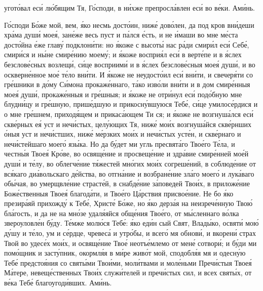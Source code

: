 \begin{mymulticols}
угот\'{о}вал ес\'{и} л\'{ю}бящим Тя, Г\'{о}споди, в н\'{и}хже препросл\'{а}влен ес\'{и} во в\'{е}ки. Ам\'{и}нь.


Г\'{о}споди Б\'{о}же мой, вем, \'{я}ко несмь дост\'{о}ин, ниж\'{е} дов\'{о}лен, да под кров вн\'{и}деши хр\'{а}ма душ\'{и} мое\'{я}, зан\'{е}же весь пуст и п\'{а}лся \'{е}сть, и не \'{и}маши во мне м\'{е}ста дост\'{о}йна \'{е}же глав\'{у} подклон\'{и}ти: но \'{я}коже с высот\'{ы} нас р\'{а}ди смир\'{и}л ес\'{и} Себ\'{е}, смир\'{и}ся и н\'{ы}не смир\'{е}нию моем\'{у}; и \'{я}коже воспри\'{я}л ес\'{и} в верт\'{е}пе и в \'{я}слех безслов\'{е}сных возлещ\'{и}, с\'{и}це восприим\'{и} и в \'{я}слех безслов\'{е}сныя мое\'{я} душ\'{и}, и во оскверн\'{е}нное мо\'{е} т\'{е}ло вн\'{и}ти. И \'{я}коже не неудост\'{о}ил ес\'{и} вн\'{и}ти, и свечер\'{я}ти со гр\'{е}шники в д\'{о}му С\'{и}мона прокаж\'{е}ннаго, т\'{а}ко изв\'{о}ли вн\'{и}ти и в дом смир\'{е}нныя мое\'{я} душ\'{и}, прокаж\'{е}нныя и гр\'{е}шныя; и \'{я}коже не отр\'{и}нул ес\'{и} под\'{о}бную мне блудн\'{и}цу и гр\'{е}шную, приш\'{е}дшую и прикосн\'{у}вшуюся Теб\'{е}, с\'{и}це умилос\'{е}рдися и о мне гр\'{е}шнем, приход\'{я}щем и прикас\'{а}ющем Ти ся; и \'{я}коже не возгнуш\'{а}лся ес\'{и} скв\'{е}рных е\'{я} уст и неч\'{и}стых, цел\'{у}ющих Тя, ниж\'{е} мо\'{и}х возгнуш\'{а}йся скв\'{е}рнших \'{о}ныя уст и неч\'{и}стших, ниж\'{е} м\'{е}рзких мо\'{и}х и неч\'{и}стых уст\'{е}н, и скв\'{е}рнаго и неч\'{и}стейшаго моег\'{о} яз\'{ы}ка. Но да б\'{у}дет ми угль пресвят\'{а}го Тво\'{е}го Т\'{е}ла, и честн\'{ы}я Твое\'{я} Кр\'{о}ве, во освящ\'{е}ние и просвещ\'{е}ние и здр\'{а}вие смир\'{е}нней мо\'{е}й душ\'{и} и т\'{е}лу, во облегч\'{е}ние т\'{я}жестей мн\'{о}гих мо\'{и}х согреш\'{е}ний, в соблюд\'{е}ние от вс\'{я}каго ди\'{а}вольскаго д\'{е}йства, во отгн\'{а}ние и возбран\'{е}ние зл\'{а}го моег\'{о} и лук\'{а}ваго об\'{ы}чая, во умерщвл\'{е}ние страст\'{е}й, в снабд\'{е}ние з\'{а}поведей Тво\'{и}х, в прилож\'{е}ние Бож\'{е}ственныя Твое\'{я} благод\'{а}ти, и Тво\'{е}го Ц\'{а}рствия присво\'{е}ние. Не бо \'{я}ко презир\'{а}яй прихожд\'{у} к Теб\'{е}, Христ\'{е} Б\'{о}же, но \'{я}ко дерз\'{а}я на неизреч\'{е}нную Тво\'{ю} бл\'{а}гость, и да не на мн\'{о}зе удал\'{я}яйся общ\'{е}ния Тво\'{е}го, от м\'{ы}сленнаго в\'{о}лка звероуловл\'{е}н б\'{у}ду. Т\'{е}мже мол\'{ю}ся Теб\'{е}: \'{я}ко ед\'{и}н сый Свят, Влад\'{ы}ко, освят\'{и} мо\'{ю} д\'{у}шу и т\'{е}ло, ум и с\'{е}рдце, чревес\'{а} и утр\'{о}бы, и всег\'{о} мя обнов\'{и}, и вкорен\'{и} страх Твой во удес\'{е}х мо\'{и}х, и освящ\'{е}ние Тво\'{е} неотъ\'{е}млемо от мен\'{е} сотвор\'{и}; и б\'{у}ди ми пом\'{о}щник и заст\'{у}пник, окормл\'{я}я в м\'{и}ре жив\'{о}т мой, сподобл\'{я}я мя и одесн\'{у}ю Теб\'{е} предсто\'{я}ния со свят\'{ы}ми Тво\'{и}ми, мол\'{и}твами и мол\'{е}ньми Преч\'{и}стыя Твое\'{я} М\'{а}тере, невещ\'{е}ственных Тво\'{и}х служ\'{и}телей и преч\'{и}стых сил, и всех свят\'{ы}х, от в\'{е}ка Теб\'{е} благоугод\'{и}вших. Ам\'{и}нь.


\end{mymulticols}
